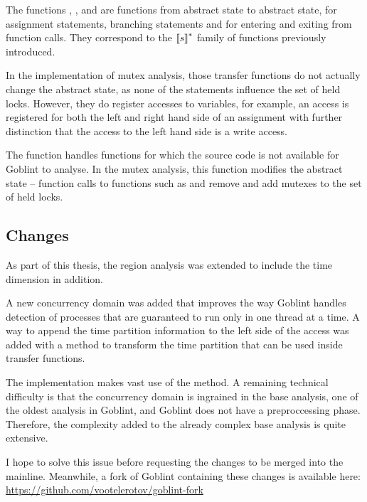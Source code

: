 \documentclass[..thesis.tex]{subfiles}
\begin{document}
The functions , ,  and  are functions from abstract state to abstract state, for assignment statements,
branching statements and for entering and exiting from function calls. They correspond to the $\left\llbracket s \right\rrbracket^{*}$ family of functions previously introduced.

In the implementation of mutex analysis, those transfer functions do not actually change the abstract state, as none of the statements influence the set of held locks.
However, they do register accesses to variables, for example, an access is registered for both the left and right hand side of an assignment with further distinction
that the access to the left hand side is a write access.

The  function handles functions for which the source code is not available for Goblint to analyse. In the mutex analysis,
this function modifies the abstract state -- function calls to functions such as  and  
remove and add mutexes to the set of held locks.


\subsection{Changes}

As part of this thesis, the region analysis was extended to include the time dimension in addition.

A new concurrency domain was added that improves the way Goblint handles detection of processes that are guaranteed to run only in one thread at a time.
A way to append the time partition information to the left side of the access was added with a method to transform the time partition that can be used inside transfer functions. 

The implementation makes vast use of the  method. A remaining technical difficulty is that the concurrency domain is ingrained in the base analysis,
one of the oldest analysis in Goblint, and Goblint does not have a preproccessing phase. Therefore, the complexity added to the already complex base analysis is quite extensive.

I hope to solve this issue before requesting the changes to be merged into the mainline.
Meanwhile, a fork of Goblint containing these changes is available here: \url{https://github.com/vootelerotov/goblint-fork}
\end{document}
